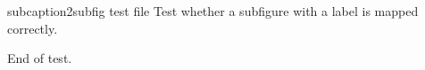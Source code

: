 subcaption2subfig test file
Test whether a subfigure with a label is mapped correctly.


End of test.
